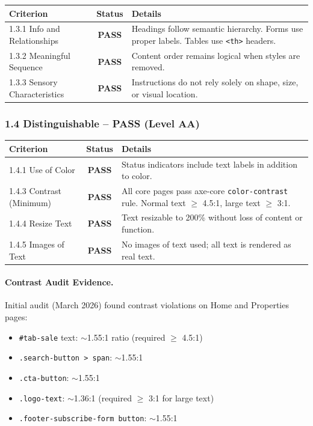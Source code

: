 \documentclass[12pt,a4paper]{article}
\newcommand{\pass}{\textcolor{passgreen}{\textbf{PASS}}}
\begin{document}
\begin{table}[H]
\centering
\begin{tabularx}{\textwidth}{lcX}
\toprule
\textbf{Criterion} & \textbf{Status} & \textbf{Details} \\
\midrule
1.3.1 Info and Relationships & \pass & Headings follow semantic hierarchy. Forms use proper labels. Tables use \texttt{<th>} headers. \\
1.3.2 Meaningful Sequence    & \pass & Content order remains logical when styles are removed. \\
1.3.3 Sensory Characteristics& \pass & Instructions do not rely solely on shape, size, or visual location. \\
\bottomrule
\end{tabularx}
\end{table}

\subsubsection{1.4 Distinguishable -- \pass{} (Level AA)}

\begin{table}[H]
\centering
\begin{tabularx}{\textwidth}{lcX}
\toprule
\textbf{Criterion} & \textbf{Status} & \textbf{Details} \\
\midrule
1.4.1 Use of Color      & \pass & Status indicators include text labels in addition to color. \\
1.4.3 Contrast (Minimum) & \pass & All core pages pass axe-core \texttt{color-contrast} rule. Normal text $\geq$ 4.5:1, large text $\geq$ 3:1. \\
1.4.4 Resize Text       & \pass & Text resizable to 200\% without loss of content or function. \\
1.4.5 Images of Text    & \pass & No images of text used; all text is rendered as real text. \\
\bottomrule
\end{tabularx}
\end{table}

\paragraph{Contrast Audit Evidence.}
Initial audit (March 2026) found contrast violations on Home and Properties pages:

\begin{itemize}[noitemsep]
    \item \texttt{\#tab-sale} text: $\sim$1.55:1 ratio (required $\geq$ 4.5:1)
    \item \texttt{.search-button > span}: $\sim$1.55:1
    \item \texttt{.cta-button}: $\sim$1.55:1
    \item \texttt{.logo-text}: $\sim$1.36:1 (required $\geq$ 3:1 for large text)
    \item \texttt{.footer-subscribe-form button}: $\sim$1.55:1
\end{itemize}
\end{document}
